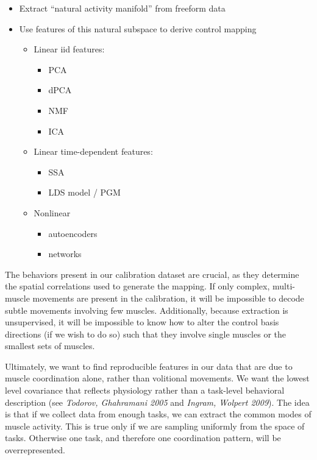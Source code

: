 \documentclass[
  a4paper,
]{article}
\providecommand{\tightlist}{%
  \setlength{\itemsep}{0pt}\setlength{\parskip}{0pt}}
\begin{document}
\begin{itemize}
\tightlist
\item
  Extract ``natural activity manifold'' from freeform data
\item
  Use features of this natural subspace to derive control mapping

  \begin{itemize}
  \tightlist
  \item
    Linear iid features:

    \begin{itemize}
    \tightlist
    \item
      PCA
    \item
      dPCA
    \item
      NMF
    \item
      ICA
    \end{itemize}
  \item
    Linear time-dependent features:

    \begin{itemize}
    \tightlist
    \item
      SSA
    \item
      LDS model / PGM
    \end{itemize}
  \item
    Nonlinear

    \begin{itemize}
    \tightlist
    \item
      autoencoders
    \item
      networks
    \end{itemize}
  \end{itemize}
\end{itemize}

The behaviors present in our calibration dataset are crucial, as they
determine the spatial correlations used to generate the mapping. If only
complex, multi-muscle movements are present in the calibration, it will
be impossible to decode subtle movements involving few muscles.
Additionally, because extraction is unsupervised, it will be impossible
to know how to alter the control basis directions (if we wish to do so)
such that they involve single muscles or the smallest sets of muscles.

Ultimately, we want to find reproducible features in our data that are
due to muscle coordination alone, rather than volitional movements. We
want the lowest level covariance that reflects physiology rather than a
task-level behavioral description (see \emph{Todorov, Ghahramani 2005}
and \emph{Ingram, Wolpert 2009}). The idea is that if we collect data
from enough tasks, we can extract the common modes of muscle activity.
This is true only if we are sampling uniformly from the space of tasks.
Otherwise one task, and therefore one coordination pattern, will be
overrepresented.
\end{document}

